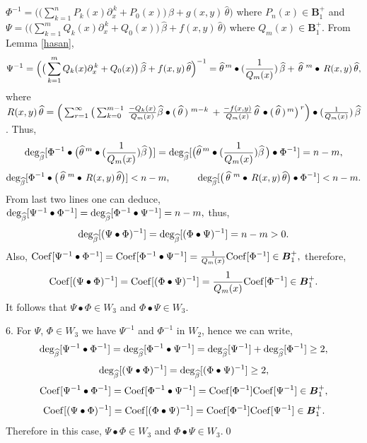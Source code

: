 \documentclass[10pt]{article}
\newcommand{\be}{\begin{equation}}
\newcommand{\ee}{\end{equation}}
\newcommand{\nn}{\nonumber}
\newcommand{\rd}{\partial}
\newcommand{\PP}{\boldsymbol{B}^{+}_1}
\newcommand{\Deg}{\rm deg_{\widehat{\beta}}}
\begin{document}
{{\begin{itemize}
{{$\Phi^{-1}=\Big(\big(\sum^{n}_{k=1} P_{k}(x)
\rd_{x}^{\,k}+P_{0}(x)\big)\,\widehat{\beta}+
 g(x,y)\,\widehat{\theta}\Big)$ where $P_{n}(x)\in \PP$
and \\ $\Psi=\Big(\big(\sum^{m}_{k=1} Q_{k}(x)
\rd_{x}^{\,k}+Q_{0}(x)\big)\,\widehat{\beta}+
 f(x,y)\,\widehat{\theta}\Big)$ where $Q_{m}(x)\in \PP $. From
Lemma \ref{hasan}, \be \Psi^{-1}=\Big(\big(\sum^{m}_{k=1} Q_{k}(x)
\rd_{x}^{\,k}+Q_{0}(x)\big)\,\widehat{\beta}+
 f(x,y)\,\widehat{\theta}\Big)^{-1}=\widehat{\theta}^{\,
m}\bullet({1\over
Q_{m}(x)})\,\widehat{\beta}+\,\widehat{\theta}\,^{\,
m}\bullet\,R(x,y)\,\widehat{\theta},\nn\ee where $
R(x,y)\,\widehat{\theta}=\Big(\sum_{r=1}^{\infty}\big(\sum_{k=0}^{m-1}
\,{-Q_{k}(x)\over
Q_{m}(x)}\widehat{\beta}\bullet(\,\widehat{\theta}\,)^{\,\,
{m-k}}\,+{-f(x,y)\over
Q_{m}(x)}\,\widehat{\theta}\,\bullet(\,\widehat{\theta}\,)^{\,m}
\big)^{\,r}\Big)\bullet ({1\over Q_{m}(x)})\,\widehat{\beta}$. Thus,
\be {\rm
deg_{\widehat{\beta}}}[\Phi^{-1}\bullet\big(\widehat{\theta}^{\,
m}\bullet({1\over Q_{m}(x)}){\widehat{\beta}}\,\big)]= {\rm
deg_{\widehat{\beta}}}[\big(\widehat{\theta}^{\, m}\bullet({1\over
Q_{m}(x)}){\widehat{\beta}}\,\big)\bullet\Phi^{-1}]=
n-m,\label{esmat1}\nn\ee   \be {\rm
deg_{\widehat{\beta}}}[\Phi^{-1}\bullet\big(\,\widehat{\theta}\,^{\,
m}\bullet\,R(x,y)\,\widehat{\theta}\big)]< n-m,\hspace{1cm} {\rm
deg_{\widehat{\beta}}}[\big(\,\widehat{\theta}\,^{\,
m}\bullet\,R(x,y)\,\widehat{\theta}\big)\bullet \Phi^{-1}]<
n-m.\label{esmat2}\nn\ee From last two lines one can deduce, $
{\Deg}[\Psi^{-1}\bullet\Phi^{-1}]={\Deg}[\Phi^{-1}\bullet\Psi^{-1}]=n-m,$
thus, \be
{\Deg}[(\Psi\bullet\Phi)^{-1}]={\Deg}[(\Phi\bullet\Psi)^{-1}]=n-m>0.\nn\ee
Also, $ {\rm Coef}[\Psi^{-1}\bullet\Phi^{-1}]=
 {\rm Coef}[\Phi^{-1}\bullet\Psi^{-1}]={1\over Q_{m}(x)}{\rm
 Coef}[\Phi^{-1}]\in\PP,$ therefore,
 \be {\rm Coef}[(\Psi\bullet\Phi)^{-1}]=
 {\rm Coef}[(\Phi\bullet\Psi)^{-1}]={1\over Q_{m}(x)}{\rm Coef}[\Phi^{-1}]\in\PP. \nn\ee
It follows that $\Psi\bullet\Phi \in W_3$ and $\Phi\bullet\Psi \in
 W_3.$}

\item[]{6.\hspace{0.5cm}  For $\Psi$, $\Phi\in W_3$ we have $\Psi^{-1}$ and $\Phi^{-1}$ in
$W_2$, hence we can write, \be {\Deg} [\Psi^{-1}\bullet\Phi^{-1}]=
{\rm deg_{\widehat{\beta}}}[\Phi^{-1}\bullet\Psi^{-1}]= {\rm
deg_{\widehat{\beta}}}[\Psi^{-1}]+ {\Deg}[\Phi^{-1}]\geq 2, \nn\ee
\be {\Deg} [(\Psi\bullet\Phi)^{-1}]= {\rm
deg_{\widehat{\beta}}}[(\Phi\bullet\Psi)^{-1}]\geq 2,\nn \ee \be
{\rm Coef}[\Psi^{-1}\bullet\Phi^{-1}]=
 {\rm Coef}[\Phi^{-1}\bullet\Psi^{-1}]=  {\rm Coef}[\Phi^{-1}] {\rm Coef}[\Psi^{-1}]\in\PP,\nn\ee
 \be {\rm
Coef}[(\Psi\bullet\Phi)^{-1}]=
 {\rm Coef}[(\Phi\bullet\Psi)^{-1}]=  {\rm Coef}[\Phi^{-1}] {\rm Coef}[\Psi^{-1}]\in\PP.\nn\ee
Therefore in this case, $\Psi\bullet\Phi \in W_3$ and
$\Phi\bullet\Psi \in
 W_3. \nn$}\qed}
 \end{itemize}

}}
\end{document}
